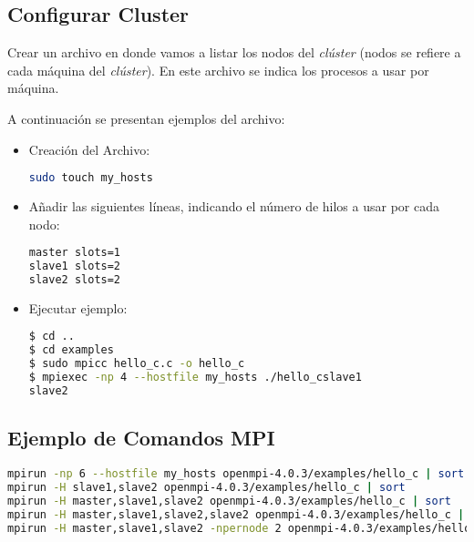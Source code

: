 \subsection{Configurar Cluster}

Crear un archivo en donde vamos a listar los nodos del \emph{clúster} (nodos se refiere a cada máquina del \emph{clúster}). En este archivo se indica los procesos a usar por máquina. 

A continuación se presentan ejemplos del archivo: 

\begin{itemize}
    \item Creación del Archivo:
\begin{lstlisting}[language=bash,style=mystyle]
sudo touch my_hosts 
\end{lstlisting}


    \item Añadir las siguientes líneas, indicando el número de hilos a usar por cada nodo:
    
\begin{lstlisting}[language=bash,style=mystyle2]
master slots=1
slave1 slots=2
slave2 slots=2
\end{lstlisting}

    \item Ejecutar ejemplo:
\begin{lstlisting}[language=bash,style=mystyle2]
$ cd ..
$ cd examples
$ sudo mpicc hello_c.c -o hello_c
$ mpiexec -np 4 --hostfile my_hosts ./hello_cslave1
slave2
\end{lstlisting}

\end{itemize}



\subsection{Ejemplo de Comandos MPI}


\begin{lstlisting}[language=bash,style=mystyle2]
mpirun -np 6 --hostfile my_hosts openmpi-4.0.3/examples/hello_c | sort
mpirun -H slave1,slave2 openmpi-4.0.3/examples/hello_c | sort
mpirun -H master,slave1,slave2 openmpi-4.0.3/examples/hello_c | sort
mpirun -H master,slave1,slave2,slave2 openmpi-4.0.3/examples/hello_c | sort
mpirun -H master,slave1,slave2 -npernode 2 openmpi-4.0.3/examples/hello_c | sort
\end{lstlisting} 


\newpage